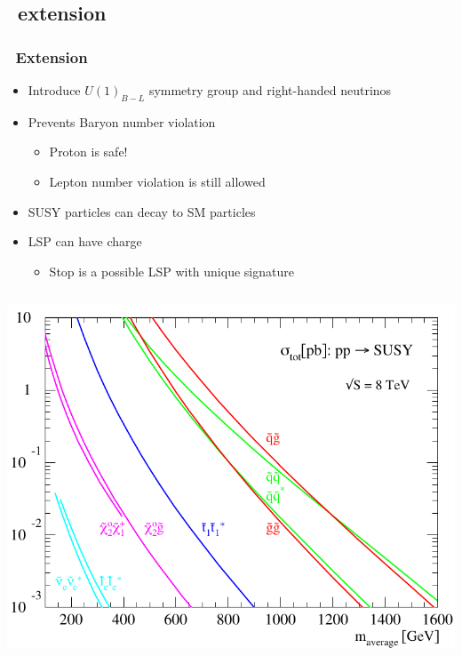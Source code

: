 \documentclass[10pt, svgnames]{beamer}
\begin{document}
\subsection{\BMINUSL\ extension}

\begin{frame}
  \frametitle{\BMINUSL\ Extension}
  \begin{itemize}
    \item Introduce $U(1)_{B-L}$ symmetry group and right-handed neutrinos
    \item Prevents Baryon number violation
      \begin{itemize}
        \item Proton is safe!
        \item Lepton number violation is still allowed
      \end{itemize}
    \item SUSY particles can decay to SM particles
    \item LSP can have charge
      \begin{itemize}
        \item Stop is a possible LSP with unique signature
      \end{itemize}
  \end{itemize}
  \begin{columns}
    \includegraphics[width=\textwidth]{figures/theory/prospino_lhc8.pdf}

\end{columns}
\end{frame}
\end{document}
